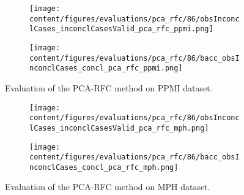 \begin{figure}[t]
  \begin{subfigure}{0.9\textwidth}
    \centering
    \texttt{[image: content/figures/evaluations/pca\_rfc/86/obsInconclCases\_inconclCasesValid\_pca\_rfc\_ppmi.png]}
    \label{fig:obsInconclCases_inconclCasesValid_pca_rfc_ppmi}
  \end{subfigure}
  \hfill
  \begin{subfigure}{0.9\textwidth}
    \centering
    \texttt{[image: content/figures/evaluations/pca\_rfc/86/bacc\_obsInconclCases\_concl\_pca\_rfc\_ppmi.png]}
    \label{fig:bacc_obsInconclCases_concl_pca_rfc_ppmi}
  \end{subfigure}
  \caption{Evaluation of the PCA-RFC method on PPMI dataset.}
\end{figure}





\begin{figure}[t]
  \begin{subfigure}{0.9\textwidth}
    \centering
    \texttt{[image: content/figures/evaluations/pca\_rfc/86/obsInconclCases\_inconclCasesValid\_pca\_rfc\_mph.png]}
    \label{fig:obsInconclCases_inconclCasesValid_pca_rfc_mph}
  \end{subfigure}
  \hfill
  \begin{subfigure}{0.9\textwidth}
    \centering
    \texttt{[image: content/figures/evaluations/pca\_rfc/86/bacc\_obsInconclCases\_concl\_pca\_rfc\_mph.png]}
    \label{fig:bacc_obsInconclCases_concl_pca_rfc_mph}
  \end{subfigure}
  \caption{Evaluation of the PCA-RFC method on MPH dataset.}
\end{figure}



